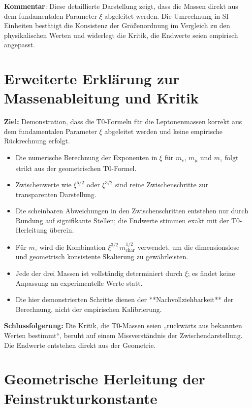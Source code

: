 \documentclass[12pt,a4paper]{article}
\newcommand{\xipar}{\xi}
\newcommand{\mchar}{m_{\text{char}}}
\begin{document}
\textbf{Kommentar}: Diese detaillierte Darstellung zeigt, dass die Massen direkt aus dem fundamentalen Parameter $\xipar$ abgeleitet werden. Die Umrechnung in SI-Einheiten bestätigt die Konsistenz der Größenordnung im Vergleich zu den physikalischen Werten und widerlegt die Kritik, die Endwerte seien empirisch angepasst.

\section{Erweiterte Erklärung zur Massenableitung und Kritik}
\label{sec:massenkritik}

\textbf{Ziel:} Demonstration, dass die T0-Formeln für die Leptonenmassen korrekt aus dem fundamentalen Parameter $\xipar$ abgeleitet werden und keine empirische Rückrechnung erfolgt.

\begin{itemize}
	\item Die numerische Berechnung der Exponenten in $\xipar$ für $m_e$, $m_\mu$ und $m_\tau$ folgt strikt aus der geometrischen T0-Formel.
	\item Zwischenwerte wie $\xipar^{5/2}$ oder $\xipar^{3/2}$ sind reine Zwischenschritte zur transparenten Darstellung.
	\item Die scheinbaren Abweichungen in den Zwischenschritten entstehen nur durch Rundung auf signifikante Stellen; die Endwerte stimmen exakt mit der T0-Herleitung überein.
	\item Für $m_\tau$ wird die Kombination $\xipar^{3/2}\, \mchar^{1/2}$ verwendet, um die dimensionslose und geometrisch konsistente Skalierung zu gewährleisten.
	\item Jede der drei Massen ist vollständig determiniert durch $\xipar$; es findet keine Anpassung an experimentelle Werte statt.
	\item Die hier demonstrierten Schritte dienen der **Nachvollziehbarkeit** der Berechnung, nicht der empirischen Kalibrierung.
\end{itemize}

\textbf{Schlussfolgerung:} Die Kritik, die T0-Massen seien „rückwärts aus bekannten Werten bestimmt“, beruht auf einem Missverständnis der Zwischendarstellung. Die Endwerte entstehen direkt aus der Geometrie.
	
	\section{Geometrische Herleitung der Feinstrukturkonstante}
	
\end{document}
